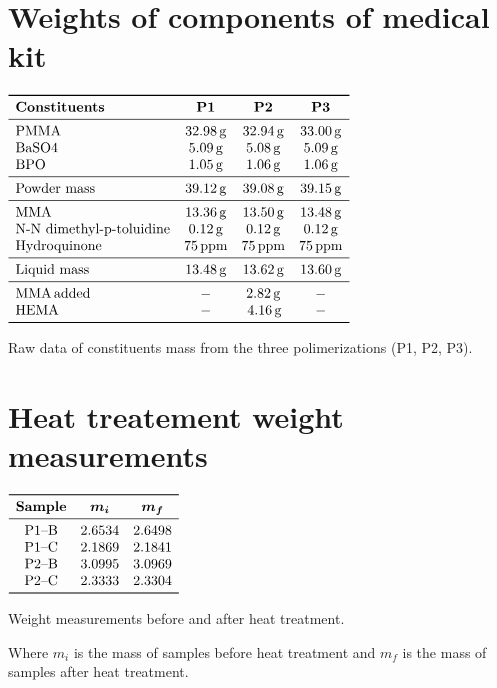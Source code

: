 \documentclass[a4paper, 11pt]{article}
\begin{document}
\begin{appendices}

\section{Weights of components of medical kit}

\begin{table}[htp]
\centering
$
\begin{array}{lccc}
\toprule
\textbf{Constituents}& \textbf{P1} & \textbf{P2} & \textbf{P3}\\
\midrule
\text{PMMA} & 32.98\,  \text{g} & 32.94\,  \text{g} & 33.00\, \text{g}  \\
\text{BaSO}4 & 5.09\,  \text{g} & 5.08\,  \text{g} & 5.09\, \text{g}\\
\text{BPO} & 1.05\,  \text{g} & 1.06\,  \text{g} & 1.06\, \text{g}\\
\midrule
\text{Powder mass} & 39.12\,  \text{g} & 39.08\,  \text{g} & 39.15\, \text{g} \\
\midrule
\text{MMA} & 13.36\, \text{g} & 13.50\,  \text{g} & 13.48\, \text{g}\\
\text{N-N dimethyl-p-toluidine} & 0.12\,  \text{g} & 0.12\,  \text{g} & 0.12\, \text{g}\\
\text{Hydroquinone} & 75\, \text{ppm} & 75\, \text{ppm} & 75\, \text{ppm}\\

\midrule
\text{Liquid mass} & 13.48\, \text{g} & 13.62\, \text{g} & 13.60\, \text{g}\\
\midrule
\text{MMA}\,\text{added} & -  & 2.82\, \text{g} & - \\
\text{HEMA} & - &\, 4.16\, \text{g} & - \\
\bottomrule
\end{array}
$
\caption{Raw data of constituents mass from the three polimerizations (P1, P2, P3).}
\label{tab:rawd}
\end{table}

\section{Heat treatement weight measurements}

\begin{table}[htp]
	\centering
	$
	\begin{array}{ccc}
	\toprule
	\textbf{Sample} & \bm{m_{i}} & \bm{m_{f}}\\
	\midrule
	\text{P1–B} & 2.6534 & 2.6498 \\
	\text{P1–C} & 2.1869 & 2.1841 \\
	\text{P2–B} & 3.0995 & 3.0969 \\
	\text{P2–C} & 2.3333 & 2.3304 \\
	\bottomrule
	\end{array}
	$
	\caption{Weight measurements before and after heat treatment.}
	\label{tab:weight}
\end{table}
Where ${m_{i}}$ is the mass of samples before heat treatment and ${m_{f}}$ is the mass of samples after heat treatment.


\end{appendices}
\end{document}
